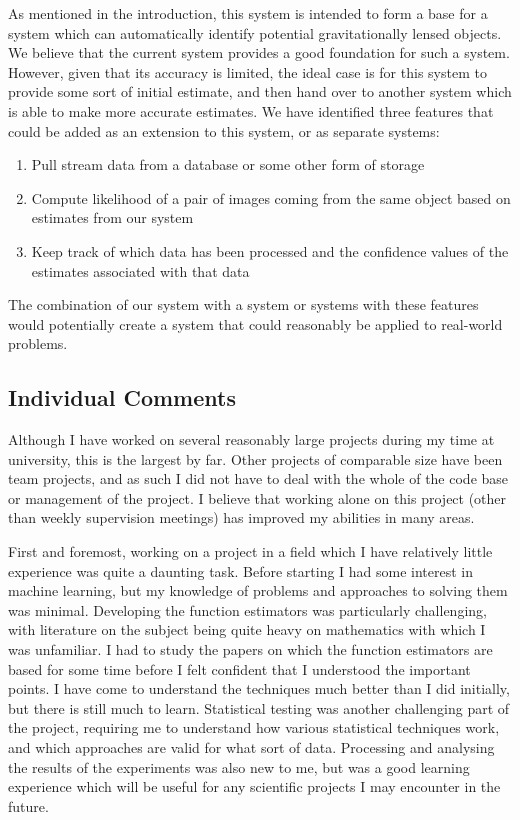 \documentclass[a4paper,11pt]{article}
\begin{document}
   As mentioned in the introduction, this system is intended to form a base for
   a system which can automatically identify potential gravitationally lensed
   objects. We believe that the current system provides a good foundation for
   such a system. However, given that its accuracy is limited, the ideal case is
   for this system to provide some sort of initial estimate, and then hand over
   to another system which is able to make more accurate estimates. We have
   identified three features that could be added as an extension to this system,
   or as separate systems:
\begin{enumerate}
\item Pull stream data from a database or some other form of storage
\item Compute likelihood of a pair of images coming from the same object based on
   estimates from our system
\item Keep track of which data has been processed and the confidence
   values of the estimates associated with that data
\end{enumerate}

   The combination of our system with a system or systems with these features would
   potentially create a system that could reasonably be applied to real-world problems.
\subsection{Individual Comments}
\label{sec-9-2}

   Although I have worked on several reasonably large projects during my time at
   university, this is the largest by far. Other projects of comparable size
   have been team projects, and as such I did not have to deal with the whole of
   the code base or management of the project. I believe that working alone on
   this project (other than weekly supervision meetings) has improved my
   abilities in many areas. 

   First and foremost, working on a project in a field which I have relatively
   little experience was quite a daunting task. Before starting I had some
   interest in machine learning, but my knowledge of problems and approaches to
   solving them was minimal. Developing the function estimators was particularly
   challenging, with literature on the subject being quite heavy on mathematics
   with which I was unfamiliar. I had to study the papers on which the function
   estimators are based for some time before I felt confident that I understood
   the important points. I have come to understand the techniques much better
   than I did initially, but there is still much to learn. Statistical testing
   was another challenging part of the project, requiring me to understand how
   various statistical techniques work, and which approaches are valid for what
   sort of data. Processing and analysing the results of the experiments was
   also new to me, but was a good learning experience which will be useful for
   any scientific projects I may encounter in the future.
\end{document}
